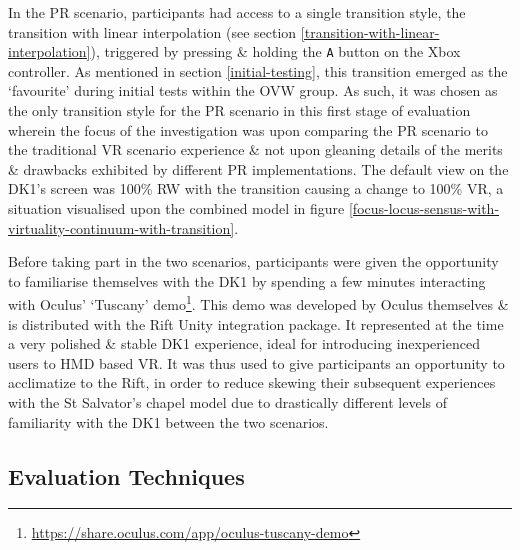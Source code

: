 In the PR scenario, participants had access to a single transition style, the transition with linear interpolation (see section \ref{transition-with-linear-interpolation}), triggered by pressing \& holding the \texttt{A} button on the Xbox controller. As mentioned in section \ref{initial-testing}, this transition emerged as the `favourite' during initial tests within the OVW group. As such, it was chosen as the only transition style for the PR scenario in this first stage of evaluation wherein the focus of the investigation was upon comparing the PR scenario to the traditional VR scenario experience \& not upon gleaning details of the merits \& drawbacks exhibited by different PR implementations. The default view on the DK1's screen was 100\% RW with the transition causing a change to 100\% VR, a situation visualised upon the combined model in figure \ref{focus-locus-sensus-with-virtuality-continuum-with-transition}.

Before taking part in the two scenarios, participants were given the opportunity to familiarise themselves with the DK1 by spending a few minutes interacting with Oculus' `Tuscany' demo\footnote{\url{https://share.oculus.com/app/oculus-tuscany-demo}}. This demo was developed by Oculus themselves \& is distributed with the Rift Unity integration package. It represented at the time a very polished \& stable DK1 experience, ideal for introducing inexperienced users to HMD based VR. It was thus used to give participants an opportunity to acclimatize to the Rift, in order to reduce skewing their subsequent experiences with the St Salvator's chapel model due to drastically different levels of familiarity with the DK1 between the two scenarios.


\subsection{Evaluation Techniques}


